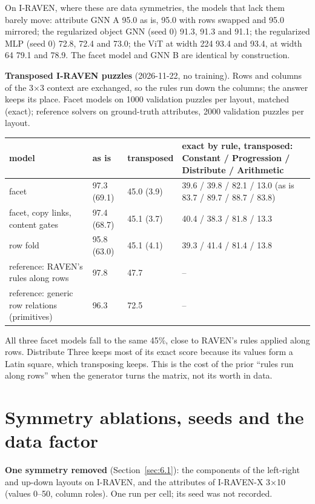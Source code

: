 On I-RAVEN, where these are data symmetries, the models that lack them barely move: attribute GNN A 95.0 as is, 95.0 with rows swapped and 95.0 mirrored; the regularized object GNN (seed 0) 91.3, 91.3 and 91.1; the regularized MLP (seed 0) 72.8, 72.4 and 73.0; the ViT at width 224 93.4 and 93.4, at width 64 79.1 and 78.9. The facet model and GNN B are identical by construction.

\textbf{Transposed I-RAVEN puzzles} (2026-11-22, no training). Rows and columns of the 3×3 context are exchanged, so the rules run down the columns; the answer keeps its place. Facet models on 1000 validation puzzles per layout, matched (exact); reference solvers on ground-truth attributes, 2000 validation puzzles per layout.

\begin{center}\small
\begin{tabularx}{\linewidth}{@{}YllY@{}}
\toprule
model & as is & transposed & exact by rule, transposed: Constant / Progression / Distribute / Arithmetic \\
\midrule
facet & 97.3 (69.1) & 45.0 (3.9) & 39.6 / 39.8 / 82.1 / 13.0 (as is 83.7 / 89.7 / 88.7 / 83.8) \\
facet, copy links, content gates & 97.4 (68.7) & 45.1 (3.7) & 40.4 / 38.3 / 81.8 / 13.3 \\
row fold & 95.8 (63.0) & 45.1 (4.1) & 39.3 / 41.4 / 81.4 / 13.8 \\
reference: RAVEN's rules along rows & 97.8 & 47.7 & – \\
reference: generic row relations (primitives) & 96.3 & 72.5 & – \\
\bottomrule
\end{tabularx}
\end{center}

All three facet models fall to the same 45\%, close to RAVEN's rules applied along rows. Distribute Three keeps most of its exact score because its values form a Latin square, which transposing keeps. This is the cost of the prior ``rules run along rows'' when the generator turns the matrix, not its worth in data.

\section{Symmetry ablations, seeds and the data factor}\label{sec:D.4}

\textbf{One symmetry removed} (Section~\ref{sec:6.1}): the components of the left-right and up-down layouts on I-RAVEN, and the attributes of I-RAVEN-X 3×10 (values 0–50, column roles). One run per cell; its seed was not recorded.

